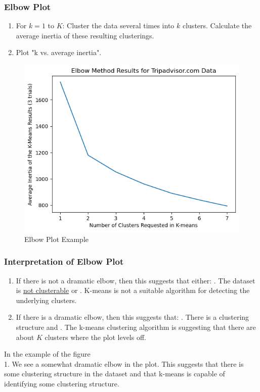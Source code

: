 \documentclass[11pt]{elegantbook}
\begin{document}
\subsubsection*{Elbow Plot}
\begin{enumerate}
    \item For $k=1$ to $K$:
    \subitem[a] Cluster the data several times into $k$ clusters.
    \subitem[b] Calculate the average inertia of these resulting clusterings.
    \item Plot "k vs. average inertia".
\end{enumerate}
\begin{center}\begin{figure}[htbp]
    \centering
    \includegraphics[scale=0.5]{elbow plot.png}
    \caption{Elbow Plot Example}
    \label{}
\end{figure}\end{center}
\subsubsection*{Interpretation of Elbow Plot}
\begin{enumerate}
    \item If there is not a dramatic elbow, then this suggests that either:
    . The dataset is \underline{not clusterable} or
    . K-means is not a suitable algorithm for detecting the underlying clusters.
    \item If there is a dramatic elbow, then this suggests that:
    . There is a clustering structure and
    . The k-means clustering algorithm is suggesting that there are about $K$ clusters where the plot levels off.
\end{enumerate}
In the example of the figure\\
1. We see a somewhat dramatic elbow in the plot. This suggests that there is some clustering structure in the dataset and that k-means is capable of identifying some clustering structure.
\end{document}

